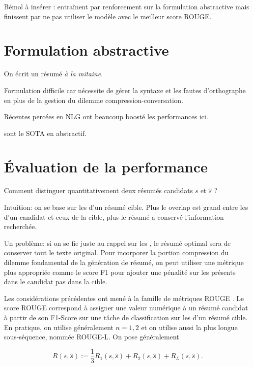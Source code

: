 Bémol à insérer : \citep{DBLP:journals/corr/PaulusXS17} entraînent par
renforcement sur la formulation abstractive mais finissent par ne pas
utiliser le modèle avec le meilleur score ROUGE.

\section{Formulation abstractive}

On écrit un résumé \textit{à la mitaine}.

Formulation difficile car nécessite de gérer la syntaxe et les fautes
d'orthographe en plus de la gestion du dilemme compression-conversation.

Récentes percées en NLG ont beaucoup boosté les performances ici.

\citep{2020t5, unilm, zhang2019pegasus} sont le SOTA en abstractif.

\section{Évaluation de la performance}

Comment distinguer quantitativement deux résumés candidats $s$ et $\hat{s}$ ?

Intuition: on se base sur les \ngrams d'un résumé cible. Plus le overlap
est grand entre les \ngrams d'un candidat et ceux de la cible, plus le résumé
a conservé l'information recherchée.

Un problème: si on se fie juste au rappel sur les \ngrams, le résumé optimal sera
de conserver tout le texte original. Pour incorporer la portion compression du dilemme
fondamental de la génération de résumé, on peut utiliser une métrique plus
appropriée comme le score F1 pour ajouter une pénalité sur les \ngrams présents dans
le candidat pas dans la cible.

Les considérations précédentes ont mené à la famille de métriques ROUGE \citep{lin-2004-rouge}.
Le score ROUGE correspond à assigner une valeur numérique à un résumé candidat à partir
de son F1-Score sur une tâche de classification sur les \ngrams d'un résumé cible.
En pratique, on utilise généralement $n={1,2}$ et on utilise aussi la plus longue
sous-séquence, nommée ROUGE-L.
On pose généralement

\begin{equation}
    \label{eq:ROUGE}
    R(s, \hat{s}) := \frac{1}{3} R_1(s, \hat{s}) + R_2(s, \hat{s}) + R_L(s, \hat{s}).
\end{equation}

